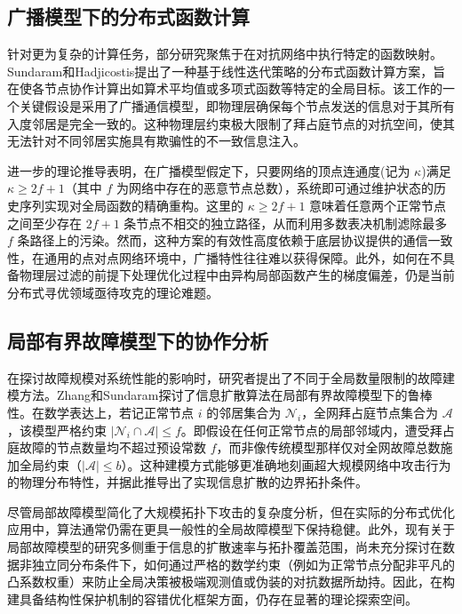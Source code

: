 \subsection{广播模型下的分布式函数计算}

\quad \quad  针对更为复杂的计算任务，部分研究聚焦于在对抗网络中执行特定的函数映射。Sundaram和Hadjicostis提出了一种基于线性迭代策略的分布式函数计算方案，旨在使各节点协作计算出如算术平均值或多项式函数等特定的全局目标\cite{sundaram2011distributed}。该工作的一个关键假设是采用了广播通信模型，即物理层确保每个节点发送的信息对于其所有入度邻居是完全一致的。这种物理层约束极大限制了拜占庭节点的对抗空间，使其无法针对不同邻居实施具有欺骗性的不一致信息注入。

进一步的理论推导表明，在广播模型假定下，只要网络的顶点连通度(记为 $\kappa$)满足 $\kappa \ge 2f+1$（其中 $f$ 为网络中存在的恶意节点总数），系统即可通过维护状态的历史序列实现对全局函数的精确重构。这里的 $\kappa \ge 2f+1$ 意味着任意两个正常节点之间至少存在 $2f+1$ 条节点不相交的独立路径，从而利用多数表决机制滤除最多 $f$ 条路径上的污染。然而，这种方案的有效性高度依赖于底层协议提供的通信一致性，在通用的点对点网络环境中，广播特性往往难以获得保障。此外，如何在不具备物理层过滤的前提下处理优化过程中由异构局部函数产生的梯度偏差，仍是当前分布式寻优领域亟待攻克的理论难题。

\subsection{局部有界故障模型下的协作分析}

\quad \quad  在探讨故障规模对系统性能的影响时，研究者提出了不同于全局数量限制的故障建模方法。Zhang和Sundaram探讨了信息扩散算法在局部有界故障模型下的鲁棒性\cite{6315661}。在数学表达上，若记正常节点 $i$ 的邻居集合为 $\mathcal{N}_i$，全网拜占庭节点集合为 $\mathcal{A}$，该模型严格约束 $|\mathcal{N}_i \cap \mathcal{A}| \le f$。即假设在任何正常节点的局部邻域内，遭受拜占庭故障的节点数量均不超过预设常数 $f$，而非像传统模型那样仅对全网故障总数施加全局约束（$|\mathcal{A}| \le b$）。这种建模方式能够更准确地刻画超大规模网络中攻击行为的物理分布特性，并据此推导出了实现信息扩散的边界拓扑条件。

尽管局部故障模型简化了大规模拓扑下攻击的复杂度分析，但在实际的分布式优化应用中，算法通常仍需在更具一般性的全局故障模型下保持稳健。此外，现有关于局部故障模型的研究多侧重于信息的扩散速率与拓扑覆盖范围，尚未充分探讨在数据非独立同分布条件下，如何通过严格的数学约束（例如为正常节点分配非平凡的凸系数权重）来防止全局决策被极端观测值或伪装的对抗数据所劫持。因此，在构建具备结构性保护机制的容错优化框架方面，仍存在显著的理论探索空间。

